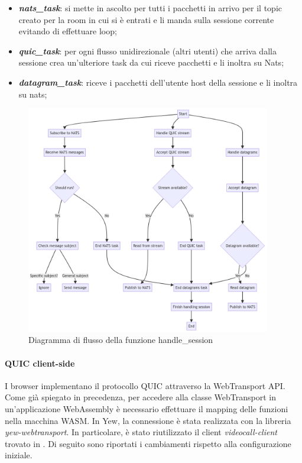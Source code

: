 \documentclass{article}
\begin{document}
\begin{itemize}
  \item \textbf{\textit{nats\_task}}: si mette in ascolto per tutti i pacchetti in arrivo 
    per il topic creato per la room in cui si è entrati e li manda sulla sessione corrente
    evitando di effettuare loop;
  \item \textbf{\textit{quic\_task}}: per ogni flusso unidirezionale (altri utenti)
    che arriva dalla sessione crea un'ulteriore task da cui riceve pacchetti e li inoltra su Nats;
  \item \textbf{\textit{datagram\_task}}: riceve i pacchetti dell'utente host della sessione 
    e li inoltra su nats;
\end{itemize}
\begin{figure}
  \begin{center}
    \includegraphics[width=0.95\textwidth]{./figures/handle_session_fwc.png}
  \end{center}
  \caption{Diagramma di flusso della funzione handle\_session}\label{fig:flowchart-handle-session}
\end{figure}

\paragraph{QUIC client-side} I browser implementano il protocollo QUIC attraverso la 
WebTransport API. Come già spiegato in precedenza, per accedere alla classe WebTransport in 
un'applicazione WebAssembly è necessario effettuare il mapping delle funzioni nella macchina 
WASM. In Yew, la connessione è stata realizzata con la libreria \textit{yew-webtransport}. 
In particolare, è stato riutilizzato il client \textit{videocall-client} trovato in 
\cite{VideoCallRs}. Di seguito sono riportati i cambiamenti rispetto alla configurazione 
iniziale. 
\end{document}
